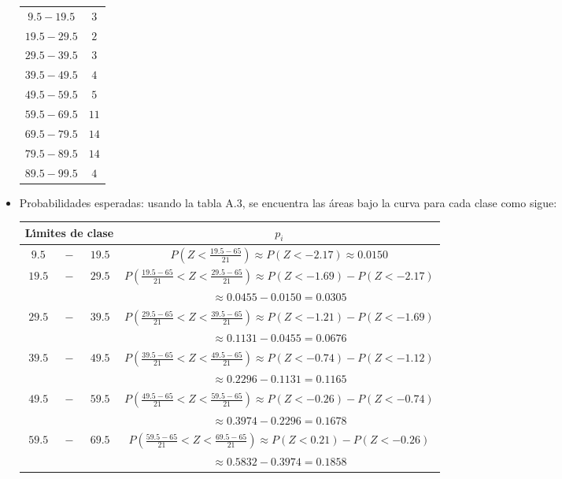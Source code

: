 \begin{solucion}
\begin{datos}
\begin{itemize}
\begin{center}
\begin{tabular}{cc}
     $ 9.5 - 19.5$ &  $3$ \\
     $19.5 - 29.5$ &  $2$ \\
     $29.5 - 39.5$ &  $3$ \\
     $39.5 - 49.5$ &  $4$ \\
     $49.5 - 59.5$ &  $5$ \\
     $59.5 - 69.5$ & $11$ \\
     $69.5 - 79.5$ & $14$ \\
     $79.5 - 89.5$ & $14$ \\
     $89.5 - 99.5$ &  $4$ \\
     \hline 
    \end{tabular}
   \end{center}
   \item Probabilidades esperadas: usando la tabla A.3,
   se encuentra las \'areas bajo la curva para cada clase como sigue:
   \begin{center}
    \begin{tabular}{cccc}
     \hline 
     \multicolumn{3}{c}{\textbf{L\'{\i}mites de clase}} & $p_i$ \\
     \hline 
     $ 9.5$ & $-$ & $19.5$ &
     $P\left( Z<\frac{19.5 - 65}{21}\right) \approx P(Z<-2.17)\approx 0.0150$ \\
     $19.5$ & $-$ & $29.5$ &
     $P\left( \frac{19.5 - 65}{21} < Z < \frac{29.5 - 65}{21} \right)
     \approx P(Z < -1.69) - P(Z < -2.17)$ \\
     & & & $\approx 0.0455 - 0.0150 = 0.0305$ \\
     $29.5$ & $-$ & $39.5$ &
     $P\left( \frac{29.5 - 65}{21} < Z < \frac{39.5 - 65}{21} \right)
     \approx P(Z < -1.21) - P(Z < -1.69)$ \\
     & & & $\approx 0.1131 - 0.0455 = 0.0676$ \\
     $39.5$ & $-$ & $49.5$ &
     $P\left( \frac{39.5 - 65}{21} < Z < \frac{49.5 - 65}{21} \right)
     \approx P(Z < -0.74) - P(Z < -1.12)$ \\
     & & & $\approx 0.2296 - 0.1131 = 0.1165$ \\
     $49.5$ & $-$ & $59.5$ &
     $P\left( \frac{49.5 - 65}{21} < Z < \frac{59.5 - 65}{21} \right)
     \approx P(Z < -0.26) - P(Z < -0.74)$ \\
     & & & $\approx 0.3974 - 0.2296 = 0.1678$ \\
     $59.5$ & $-$ & $69.5$ &
     $P\left( \frac{59.5 - 65}{21} < Z < \frac{69.5 - 65}{21} \right)
     \approx P(Z < 0.21) - P(Z < -0.26)$ \\
     & & & $\approx 0.5832 - 0.3974 = 0.1858$ \\

\end{tabular}
\end{center}
\end{itemize}
\end{datos}
\end{solucion}
